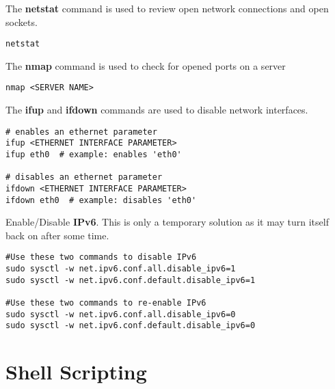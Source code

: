 The \textbf{netstat} command is used to review open network connections and open sockets. 
\begin{lstlisting}
netstat
\end{lstlisting}

The \textbf{nmap} command is used to check for opened ports on a server
\begin{lstlisting}
nmap <SERVER NAME>
\end{lstlisting}

The \textbf{ifup} and \textbf{ifdown} commands are used to disable network interfaces.
\begin{lstlisting}
# enables an ethernet parameter
ifup <ETHERNET INTERFACE PARAMETER>
ifup eth0  # example: enables 'eth0'

# disables an ethernet parameter
ifdown <ETHERNET INTERFACE PARAMETER>
ifdown eth0  # example: disables 'eth0'
\end{lstlisting}

Enable/Disable \textbf{IPv6}. This is only a temporary solution as it may turn itself back on after some time.
\begin{lstlisting}
#Use these two commands to disable IPv6
sudo sysctl -w net.ipv6.conf.all.disable_ipv6=1
sudo sysctl -w net.ipv6.conf.default.disable_ipv6=1

#Use these two commands to re-enable IPv6
sudo sysctl -w net.ipv6.conf.all.disable_ipv6=0
sudo sysctl -w net.ipv6.conf.default.disable_ipv6=0
\end{lstlisting}






\section{Shell Scripting}

